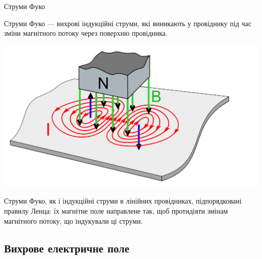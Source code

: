 \documentclass[onlytextwidth]{beamer}
\begin{document}
\begin{frame}{Струми Фуко}{}
	\begin{block}{}\justifying
		Струми Фуко --- вихрові індукційні струми, які виникають у провіднику під час зміни магнітного потоку через поверхню провідника.
	\end{block}
	\begin{center}
		\includegraphics[width=.5\linewidth]{Fuko_currents}
	\end{center}

	\begin{block}{}\justifying
		Струми Фуко, як і індукційні струми в лінійних провідниках, підпорядковані правилу Ленца: їх магнітне поле направлене так, щоб протидіяти змінам
		магнітного потоку, що індукували ці струми.
	\end{block}
\end{frame}


%




\subsection{Вихрове електричне поле}
\end{document}
